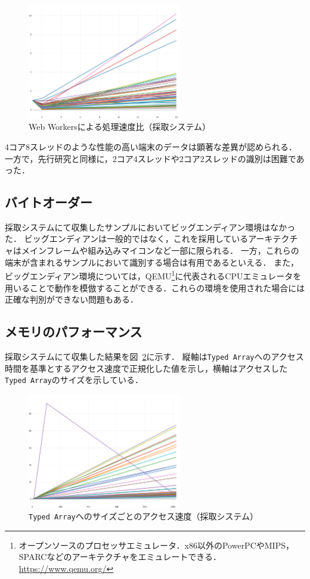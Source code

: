 \begin{figure}[H]
    \centering
    \includegraphics[width=0.6\textwidth,pagebox=cropbox]{fig/cpu_rst.pdf}
    \caption{Web Workersによる処理速度比（採取システム）}
    \label{fig-cpu_rst}
\end{figure}

4コア8スレッドのような性能の高い端末のデータは顕著な差異が認められる．
一方で，先行研究と同様に，2コア4スレッドや2コア2スレッドの識別は困難であった．


\subsection{バイトオーダー}
採取システムにて収集したサンプルにおいてビッグエンディアン環境はなかった．
ビッグエンディアンは一般的ではなく，これを採用しているアーキテクチャはメインフレームや組み込みマイコンなど一部に限られる．
一方，これらの端末が含まれるサンプルにおいて識別する場合は有用であるといえる．
また，ビッグエンディアン環境については，QEMU\footnote{オープンソースのプロセッサエミュレータ．x86以外のPowerPCやMIPS，SPARCなどのアーキテクチャをエミュレートできる．\url{https://www.qemu.org/}}に代表されるCPUエミュレータを用いることで動作を模倣することができる．これらの環境を使用された場合には正確な判別ができない問題もある．

\subsection{メモリのパフォーマンス}
採取システムにて収集した結果を図~\ref{fig-memory_rst}に示す．
縦軸は\texttt{Typed Array}へのアクセス時間を基準とするアクセス速度で正規化した値を示し，横軸はアクセスした\texttt{Typed Array}のサイズを示している．

\begin{figure}[H]
    \centering
    \includegraphics[width=0.6\textwidth,pagebox=cropbox]{fig/memory_rst.pdf}
    \caption{\texttt{Typed Array}へのサイズごとのアクセス速度（採取システム）}
    \label{fig-memory_rst}
\end{figure}

